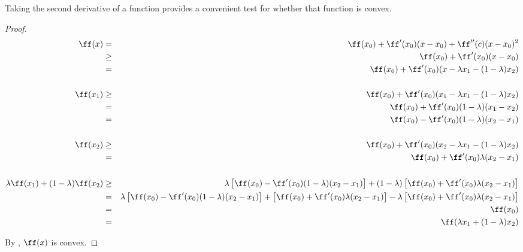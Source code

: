 Taking the second derivative of a function provides a convenient test
for whether that function is convex.
\begin{theorem}
\label{thm:convex_d2}
\end{theorem}
\begin{proof}
\begin{eqnarray*}
  \ff(x)
    &=&   \ff(x_0) + \ff'(x_0)(x-x_0) + \ff''(c)(x-x_0)^2
  \\&\ge& \ff(x_0) + \ff'(x_0)(x-x_0)
  \\&=&   \ff(x_0) + \ff'(x_0)(x-\lambda x_1 - (1-\lambda)x_2)
\\
\\
  \ff(x_1)
    &\ge& \ff(x_0) + \ff'(x_0)(x_1-\lambda x_1 - (1-\lambda)x_2)
  \\&=&   \ff(x_0) + \ff'(x_0)(1-\lambda)(x_1-x_2)
  \\&=&   \ff(x_0) - \ff'(x_0)(1-\lambda)(x_2-x_1)
\\
\\
  \ff(x_2)
    &\ge& \ff(x_0) + \ff'(x_0)(x_2-\lambda x_1 - (1-\lambda)x_2)
  \\&=&   \ff(x_0) + \ff'(x_0)\lambda (x_2-x_1)
\\
\\
  \lambda\ff(x_1) + (1-\lambda)\ff(x_2)
    &\ge& \lambda\left[\ff(x_0) - \ff'(x_0)(1-\lambda)(x_2-x_1)\right] +
          (1-\lambda)\left[\ff(x_0) + \ff'(x_0)\lambda (x_2-x_1)\right]
  \\&=&   \lambda\left[\ff(x_0) - \ff'(x_0)(1-\lambda)(x_2-x_1)\right]
          +\left[\ff(x_0) + \ff'(x_0)\lambda (x_2-x_1)\right]
          -\lambda\left[\ff(x_0) + \ff'(x_0)\lambda (x_2-x_1)\right]
  \\&=&  \ff(x_0)
  \\&=&  \ff(\lambda x_1 + (1-\lambda)x_2)
\end{eqnarray*}

By , $\ff(x)$ is convex.
\end{proof}




